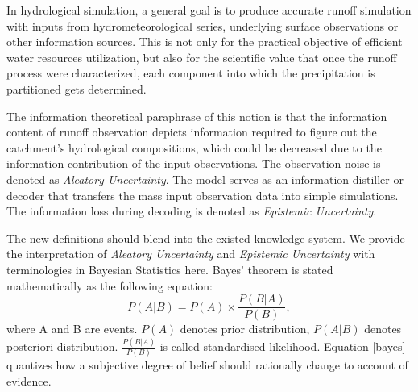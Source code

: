 In hydrological simulation, a general goal is to produce 
accurate runoff simulation with inputs from 
hydrometeorological series, underlying surface observations 
or other information sources. This is not only for the 
practical objective of efficient water resources 
utilization, but also for the scientific value that once 
the runoff process were characterized, each component into 
which the precipitation is partitioned gets determined. 

The information theoretical paraphrase of this notion is 
that the information content of runoff observation depicts 
information required to figure out the catchment's 
hydrological compositions, which could be decreased due to 
the information contribution of the input observations. The 
observation noise is denoted as \emph{Aleatory 
Uncertainty}. The model serves as an information distiller 
or decoder that transfers the mass input observation data 
into simple simulations. The information loss during 
decoding is denoted as \emph{Epistemic Uncertainty}.

The new definitions should blend into the existed knowledge 
system. We provide the interpretation of \emph{Aleatory 
Uncertainty} and \emph{Epistemic Uncertainty} with 
terminologies in Bayesian Statistics here. Bayes' theorem 
is stated mathematically as the following equation:
\begin{equation}
\label{bayes}
P(A|B) = P(A)\times \frac{P(B | A)}{P(B)},
\end{equation}
where A and B are events.
$P(A)$ denotes prior distribution, $P(A|B)$ denotes 
posteriori distribution. $\frac{P(B | A)}{P(B)}$ is called 
standardised likelihood. 
Equation \ref{bayes} quantizes how a subjective degree of 
belief should rationally change to account of evidence. 

